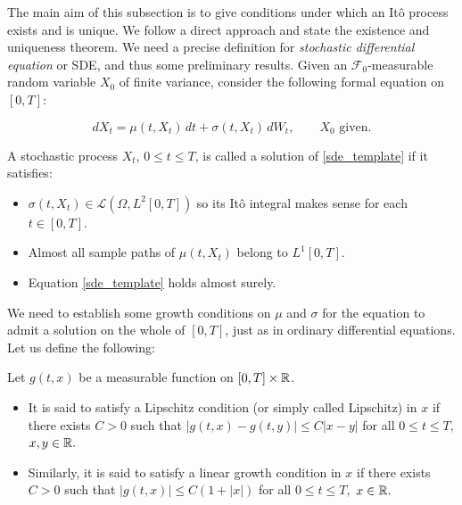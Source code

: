The main aim of this subsection is to give conditions under which an Itô process exists and is unique. We follow a direct approach and state the existence and uniqueness theorem.  We need a precise definition for \textit{stochastic differential equation} or SDE, and thus some preliminary results. Given an $\mathcal{F}_0$-measurable random variable $X_0$ of finite variance, consider the following formal equation on $[0,T]$: 

\begin{equation}\label{sde_template}
    dX_t = \mu(t,X_t) \, dt + \sigma ( t, X_t) \, dW_t , \qquad X_0 \text{ given.}
\end{equation}

\begin{definition}\label{def:sdesolution}
    A stochastic process $X_t$, $0\leq t \leq T$, is called a solution of \eqref{sde_template} if it satisfies:

    \begin{itemize}
        \item $\sigma(t,X_t) \in \mathcal{L}(\Omega,L^2[0,T])$ so its Itô integral makes sense for each $t\in [0,T].$
        \item Almost all sample paths of $\mu(t,X_t)$ belong to $L^1[0,T]$.
        \item Equation \eqref{sde_template} holds almost surely.
     \end{itemize}
\end{definition}

We need to establish some growth conditions on $\mu$ and $\sigma$ for the equation to admit a solution on the whole of $[0,T]$, just as in ordinary differential equations. Let us define the following:

\begin{definition}\label{def:lipschitzgrowth}
    Let $g(t,x)$ be a measurable function on $[0,T] \times \mathbb{R}$.

    \begin{itemize}
        \item It is said to satisfy a Lipschitz condition (or simply called Lipschitz) in $x$ if there exists $C>0$ such that $|g(t,x)-g(t,y) |\leq C |x-y| $ for all $0 \leq t \leq T,$ $x,y\in\mathbb{R}.$
        \item Similarly, it is said to satisfy a linear growth condition in $x$ if there exists $C>0$ such that $|g(t,x)|\leq C(1+|x|)$ for all $0 \leq t \leq T,$ $x\in\mathbb{R}.$
    \end{itemize}
\end{definition}

